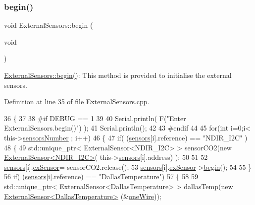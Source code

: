 \subsubsection{\texorpdfstring{begin()}{begin()}}
{\footnotesize\ttfamily void External\+Sensors\+::begin (\begin{DoxyParamCaption}\item[{void}]{ }\end{DoxyParamCaption})}

\hyperlink{class_external_sensors_a58ede0d786a86417254708870f04a21e}{External\+Sensors\+::begin()}\+: This method is provided to initialise the external sensors. 

Definition at line 35 of file External\+Sensors.\+cpp.


\begin{DoxyCode}
36 \{
37 
38 \textcolor{preprocessor}{#if DEBUG == 1}
39 
40     Serial.println( F(\textcolor{stringliteral}{"Enter ExternalSensors.begin()"}) );
41     Serial.println();
42 
43 \textcolor{preprocessor}{#endif }
44 
45     \textcolor{keywordflow}{for}(\textcolor{keywordtype}{int} i=0;i< this->\hyperlink{class_external_sensors_a58e4fbf9adeae787d92be5fa33043b5d}{sensorsNumber} ; i++)
46     \{
47         \textcolor{keywordflow}{if}( (\hyperlink{class_external_sensors_a284233f884fcf00154a44740cf1d9e1e}{sensors}[i].reference) == \textcolor{stringliteral}{"NDIR\_I2C"} )
48         \{   
49             std::unique\_ptr< ExternalSensor<NDIR\_I2C> > sensorCO2(\textcolor{keyword}{new} 
      \hyperlink{class_external_sensor_3_01_n_d_i_r___i2_c_01_4}{ExternalSensor<NDIR\_I2C>}( this->\hyperlink{class_external_sensors_a284233f884fcf00154a44740cf1d9e1e}{sensors}[i].address) );
50 
51 
52             \hyperlink{class_external_sensors_a284233f884fcf00154a44740cf1d9e1e}{sensors}[i].\hyperlink{struct_external_sensors_1_1sensor_a9bca150fd468b8d0e090e6d72c5c2b48}{exSensor}= sensorCO2.release();
53             \hyperlink{class_external_sensors_a284233f884fcf00154a44740cf1d9e1e}{sensors}[i].\hyperlink{struct_external_sensors_1_1sensor_a9bca150fd468b8d0e090e6d72c5c2b48}{exSensor}->\hyperlink{class_base_external_sensor_a87d132803d4f4fdd4e66332809f0c9a0}{begin}();
54 
55         \}
56         \textcolor{keywordflow}{if}( (\hyperlink{class_external_sensors_a284233f884fcf00154a44740cf1d9e1e}{sensors}[i].reference) == \textcolor{stringliteral}{"DallasTemperature"})
57         \{
58 
59             std::unique\_ptr< ExternalSensor<DallasTemperature> > dallasTemp(\textcolor{keyword}{new} 
      \hyperlink{class_external_sensor_3_01_dallas_temperature_01_4}{ExternalSensor<DallasTemperature>} (&\hyperlink{_external_sensors_8cpp_af39fa3dad1ba161b384c0b26b8145e65}{oneWire}));

\end{DoxyCode}
